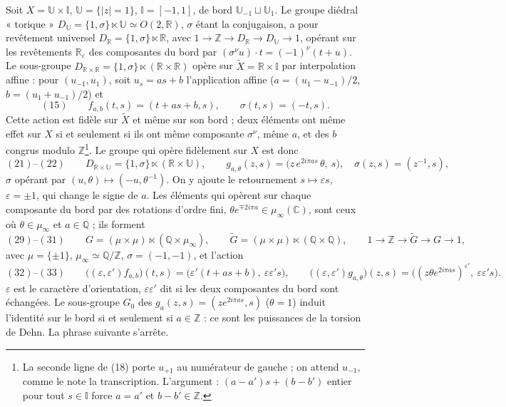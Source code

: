 \documentclass[11pt,a4paper]{article}
\begin{document}
Soit $X = \mathbb{U} \times \mathbb{I}$, $\mathbb{U} = \{|z| = 1\}$,
$\mathbb{I} = [-1, 1]$, de bord $\mathbb{U}_{-1} \sqcup \mathbb{U}_1$. Le groupe
diédral « torique » $D_{\mathbb{U}} = \{1, \sigma\} \ltimes \mathbb{U} \simeq O(2, \mathbb{R})$,
$\sigma$ étant la conjugaison, a pour revêtement universel
$D_{\mathbb{R}} = \{1, \sigma\} \ltimes \mathbb{R}$, avec
$1 \to \mathbb{Z} \to D_{\mathbb{R}} \to D_{\mathbb{U}} \to 1$, opérant sur les
revêtements $\mathbb{R}_\varepsilon$ des composantes du bord par
$(\sigma^\nu u)\cdot t = (-1)^\nu(t + u)$. Le sous-groupe
$D_{\mathbb{R}\times\mathbb{R}} = \{1, \sigma\} \ltimes (\mathbb{R} \times \mathbb{R})$
opère sur $\widetilde{X} = \mathbb{R} \times \mathbb{I}$ par interpolation
affine : pour $(u_{-1}, u_1)$, soit $u_s = as + b$ l'application affine
($a = (u_1 - u_{-1})/2$, $b = (u_1 + u_{-1})/2$) et
\[
(15)\qquad f_{a,b}(t, s) = (t + as + b, s), \qquad \sigma(t, s) = (-t, s).
\]
Cette action est fidèle sur $\widetilde{X}$ et même sur son bord ; deux
éléments ont même effet sur $X$ si et seulement si ils ont même composante
$\sigma^\nu$, même $a$, et des $b$ congrus modulo $\mathbb{Z}$\footnote{La
seconde ligne de (18) porte $u_{+1}$ au numérateur de gauche ; on attend
$u_{-1}$, comme le note la transcription. L'argument : $(a - a')s + (b - b')$
entier pour tout $s \in \mathbb{I}$ force $a = a'$ et $b - b' \in \mathbb{Z}$.}.
Le groupe qui opère fidèlement sur $X$ est donc
\[
(21)\text{--}(22)\qquad D_{\mathbb{R}\times\mathbb{U}} = \{1, \sigma\} \ltimes (\mathbb{R} \times \mathbb{U}),
\qquad g_{a,\theta}(z, s) = \bigl(z\, e^{2i\pi as}\,\theta,\ s\bigr), \quad \sigma(z, s) = (z^{-1}, s),
\]
$\sigma$ opérant par $(u, \theta) \mapsto (-u, \theta^{-1})$. On y ajoute le
retournement $s \mapsto \varepsilon s$, $\varepsilon = \pm 1$, qui change le
signe de $a$. Les éléments qui opèrent sur chaque composante du bord par des
rotations d'ordre fini, $\theta e^{\mp 2i\pi a} \in \mu_\infty(\mathbb{C})$,
sont ceux où $\theta \in \mu_\infty$ et $a \in \mathbb{Q}$ ; ils forment
\[
(29)\text{--}(31)\qquad G = (\mu \times \mu) \ltimes (\mathbb{Q} \times \mu_\infty),
\qquad \widetilde{G} = (\mu \times \mu) \ltimes (\mathbb{Q} \times \mathbb{Q}),
\qquad 1 \to \mathbb{Z} \to \widetilde{G} \to G \to 1,
\]
avec $\mu = \{\pm 1\}$, $\mu_\infty \simeq \mathbb{Q}/\mathbb{Z}$, $\sigma = (-1, -1)$,
et l'action
\[
(32)\text{--}(33)\qquad \bigl((\varepsilon, \varepsilon') f_{a,b}\bigr)(t, s) = \bigl(\varepsilon'(t + as + b),\ \varepsilon\varepsilon' s\bigr),
\qquad \bigl((\varepsilon, \varepsilon') g_{a,\theta}\bigr)(z, s) = \bigl((z\theta e^{2i\pi as})^{\varepsilon'},\ \varepsilon\varepsilon' s\bigr).
\]
$\varepsilon$ est le caractère d'orientation, $\varepsilon\varepsilon'$ dit si les
deux composantes du bord sont échangées. Le sous-groupe $G_0$ des
$g_a(z, s) = (z e^{2i\pi as}, s)$ ($\theta = 1$) induit l'identité sur le bord
si et seulement si $a \in \mathbb{Z}$ : ce sont les puissances de la torsion de
Dehn. La phrase suivante s'arrête.
\end{document}
